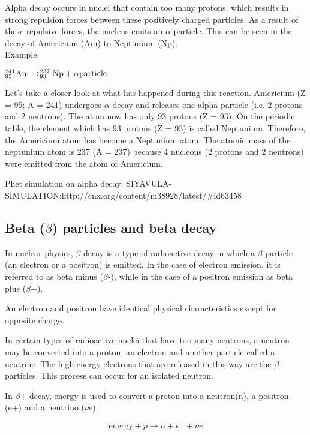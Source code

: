 Alpha decay occurs in nuclei that contain too many protons, which results in strong repulsion forces between these positively charged particles. As a result of these repulsive forces, the nucleus emits an $\alpha$ particle. This can be seen in the decay of Americium (Am) to Neptunium (Np).\\

Example:

\begin{center}
$\rm{^{241}_{95}Am \rightarrow ^{237}_{93}Np + \alpha particle}$
\end{center}

Let's take a closer look at what has happened during this reaction. Americium (Z = 95; A = 241) undergoes $\alpha$ decay and releases one alpha particle (i.e. 2 protons and 2 neutrons). The atom now has only 93 protons (Z = 93). On the periodic table, the element which has 93 protons (Z = 93) is called Neptunium. Therefore, the Americium atom has become a Neptunium atom. The atomic mass of the neptunium atom is 237 (A = 237) because 4 nucleons (2 protons and 2 neutrons) were emitted from the atom of Americium.

Phet simulation on alpha decay: SIYAVULA-SIMULATION:http://cnx.org/content/m38928/latest/#id63458
\subsection{Beta ($\beta$) particles and beta decay}
In nuclear physics, $\beta$ decay is a type of radioactive decay in which a $\beta$ particle (an electron or a positron) is emitted. In the case of electron emission, it is referred to as beta minus ($\beta$-), while in the case of a positron emission as beta plus ($\beta$+).

An electron and positron have identical physical characteristics except for opposite charge.

In certain types of radioactive nuclei that have too many neutrons, a neutron may be converted into a proton, an electron and another particle called a neutrino. The high energy electrons that are released in this way are the $\beta$ - particles. This process can occur for an isolated neutron.

In $\beta$+ decay, energy is used to convert a proton into a neutron(n), a
positron (e+) and a neutrino ($\nu$e):

\begin{equation*}
\mbox{energy} + p \rightarrow n + e^+ + {\nu}e
\end{equation*}

